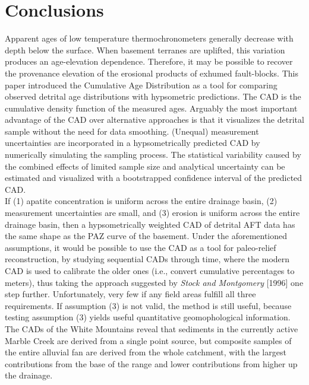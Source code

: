 \documentclass[12pt,twoside]{article}
\begin{document}
\section{Conclusions}

Apparent ages of low temperature thermochronometers generally decrease
with depth  below the surface.   When basement terranes  are uplifted,
this  variation produces an  age-elevation dependence.   Therefore, it
may be possible  to recover the provenance elevation  of the erosional
products of exhumed fault-blocks. This paper introduced the Cumulative
Age  Distribution  as  a  tool  for comparing  observed  detrital  age
distributions with hypsometric predictions.  The CAD is the cumulative
density  function of the  measured ages.  Arguably the  most important
advantage of the CAD over alternative approaches is that it visualizes
the  detrital sample without  the need  for data  smoothing. (Unequal)
measurement  uncertainties  are   incorporated  in  a  hypsometrically
predicted  CAD by  numerically simulating  the sampling  process.  The
statistical  variability caused  by  the combined  effects of  limited
sample size and analytical uncertainty can be estimated and visualized
with a bootstrapped confidence interval of the predicted CAD.\\

If  (1) apatite concentration  is uniform  across the  entire drainage
basin,  (2) measurement uncertainties  are small,  and (3)  erosion is
uniform  across  the entire  drainage  basin,  then a  hypsometrically
weighted CAD of detrital AFT data  has the same shape as the PAZ curve
of the  basement.  Under the  aforementioned assumptions, it  would be
possible to use the CAD  as a tool for paleo-relief reconstruction, by
studying sequential CADs through time, where the modern CAD is used to
calibrate  the older  ones  (i.e., convert  cumulative percentages  to
meters),  thus  taking  the  approach  suggested  by  {\it  Stock  and
  Montgomery} [1996] one step further.  Unfortunately, very few if any
field areas fulfill all three  requirements.  If assumption (3) is not
valid,  the method  is still  useful, because  testing  assumption (3)
yields useful  quantitative geomophological information.   The CADs of
the  White Mountains  reveal that  sediments in  the  currently active
Marble Creek  are derived  from a single  point source,  but composite
samples  of  the  entire  alluvial  fan are  derived  from  the  whole
catchment, with the  largest contributions from the base  of the range
and lower contributions from higher up the drainage.
\\
\end{document}

